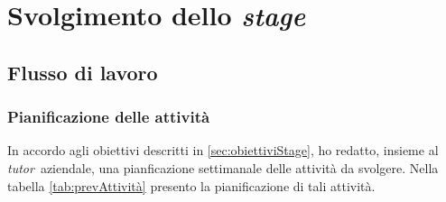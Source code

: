 \chapter{Svolgimento dello \textit{stage}} 
\label{cap:descrizione-stage}

\section{Flusso di lavoro}
\subsection{Pianificazione delle attività}
In accordo agli obiettivi descritti in \ref{sec:obiettiviStage}, ho redatto, insieme al \textit{tutor} aziendale, una pianficazione settimanale delle attività da svolgere.
Nella tabella \ref{tab:prevAttività} presento la pianificazione di tali attività.

